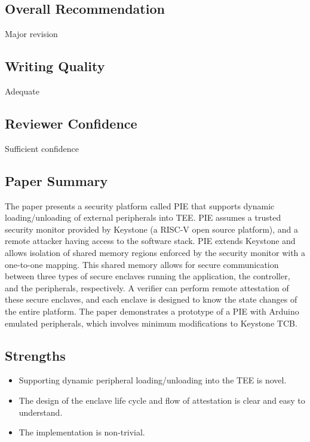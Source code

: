 \documentclass[9pt]{article}
\begin{document}
\subsection{Overall Recommendation}


  Major revision


\subsection{Writing Quality}


  Adequate


\subsection{Reviewer Confidence}


  Sufficient confidence


\subsection{Paper Summary}

The paper presents a security platform called PIE that supports dynamic
loading/unloading of external peripherals into TEE. PIE assumes a
trusted security monitor provided by Keystone (a RISC-V open source
platform), and a remote attacker having access to the software stack.
PIE extends Keystone and allows isolation of shared memory regions
enforced by the security monitor with a one-to-one mapping. This shared
memory allows for secure communication between three types of secure
enclaves running the application, the controller, and the peripherals,
respectively. A verifier can perform remote attestation of these secure
enclaves, and each enclave is designed to know the state changes of the
entire platform. The paper demonstrates a prototype of a PIE with
Arduino emulated peripherals, which involves minimum modifications to
Keystone TCB.

\subsection{Strengths}

\begin{itemize}
\item
  Supporting dynamic peripheral loading/unloading into the TEE is novel.
\item
  The design of the enclave life cycle and flow of attestation is clear
  and easy to understand.
\item
  The implementation is non-trivial.
\end{itemize}
\end{document}
